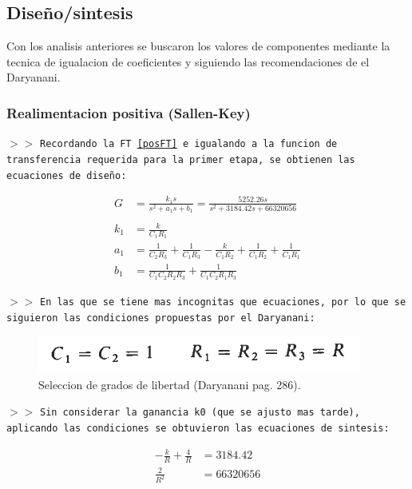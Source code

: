 \subsection{Diseño/sintesis}

Con los analisis anteriores se buscaron los valores de componentes mediante la tecnica de igualacion de coeficientes y siguiendo las recomendaciones de el Daryanani.

\subsubsection{Realimentacion positiva (Sallen-Key)}

\noindent $>>$ \texttt{Recordando la FT \ref{posFT} e igualando a la funcion de transferencia requerida para la primer etapa, se obtienen las ecuaciones de diseño:}

\begin{align*}
    G &= \frac{k_1 s}{s^{2} + a_1 s + b_1} = \frac{5252.26 s}{s^{2} + 3184.42 s + 66320656} \\\\
    k_1 &= \frac{k}{C_{1} R_{1}} \\
    a_1 &= \frac{1}{C_{2} R_{3}} + \frac{1}{C_{1} R_{3}} - \frac{k}{C_{1} R_{2}} + \frac{1}{C_{1} R_{2}} + \frac{1}{C_{1} R_{1}} \\
    b_1 &= \frac{1}{C_{1} C_{2} R_{2} R_{3}} + \frac{1}{C_{1} C_{2} R_{1} R_{3}}
\end{align*}

\noindent $>>$ \texttt{En las que se tiene mas incognitas que ecuaciones, por lo que se siguieron las condiciones propuestas por el Daryanani:}

\begin{figure}[H]
    \centering
    \includegraphics[scale=.8]{Secciones/Circ1/img/daryanani286.png}
    \caption{Seleccion de grados de libertad (Daryanani pag. 286).}
    \label{pv1}
\end{figure}

\noindent $>>$ \texttt{Sin considerar la ganancia k0 (que se ajusto mas tarde), aplicando las condiciones se obtuvieron las ecuaciones de sintesis:}

\begin{align*}
    - \frac{k}{R} + \frac{4}{R} &= 3184.42 \\
    \frac{2}{R^{2}} &= 66320656
\end{align*}

